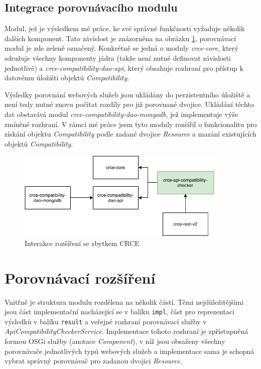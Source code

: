 \documentclass[czech,DP]{thesiskiv}
\begin{document}
\subsection{Integrace porovnávacího modulu}

Modul, jež je výsledkem mé práce, ke své správné funkčnosti vyžaduje několik dalších komponent. Tato závislost je znázorněna na obrázku \ref{fig:apicomp-crce-interaction}, porovnávací modul je zde zeleně označený. Konkrétně se jedná o moduly \textit{crce-core}, který sdružuje všechny komponenty jádra (takže není nutné definovat závislosti jednotlivě) a \textit{crce-compatibility-dao-api}, který obsahuje rozhraní pro přístup k datovému úložišti objektů \textit{Compatibility}. 

Výsledky porovnání webových služeb jsou ukládány do perzistentního úložiště a není tedy nutné znovu počítat rozdíly pro již porovnané dvojice. Ukládání těchto dat obstarává modul \textit{crce-compatibility-dao-mongodb}, jež implementuje výše  zmíněné rozhraní. V rámci mé práce jsem tyto moduly rozšířil o funkcionalitu pro získání objektu \textit{Compatibility} podle zadané dvojice \textit{Resource} a mazání existujících objektů \textit{Compatibility}.

\begin{figure}[h]
	\centering
	\includegraphics[width=10cm]{module-integration}
	\caption{Interakce rozšíření se zbytkem CRCE}
	\label{fig:apicomp-crce-interaction}
\end{figure}

\section{Porovnávací rozšíření}

Vnitřně je struktura modulu rozdělena na několik částí. Těmi nejdůležitějšími jsou část implementační nacházející se v balíku \verb|impl|, část pro reprezentaci výsledků v balíku \verb|result| a veřejné rozhraní porovnávací služby v \textit{ApiCompatibilityCheckerService}. Implementace tohoto rozhraní je zpřístupněná formou OSGi služby (anotace \textit{Component}), v níž jsou obsaženy všechny porovnávače jednotlivých typů webových služeb a implementace sama je schopná vybrat správný porovnávač pro zadanou dvojici \textit{Resource}.
\end{document}
